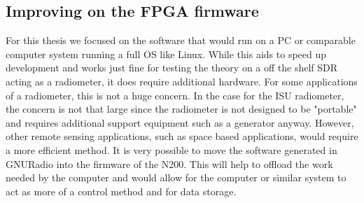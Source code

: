 

\subsection{Improving on the FPGA firmware}

For this thesis we focused on the software that would run on a PC or comparable computer system running a full OS like Linux.  While this aids to speed up development and works just fine for testing the theory on a off the shelf SDR acting as a radiometer, it does require additional hardware.  For some applications of a radiometer, this is not a huge concern.  In the case for the ISU radiometer, the concern is not that large since the radiometer is not designed to be "portable" and requires additional support equipment such as a generator anyway.  However, other remote sensing applications, such as space based applications, would require a more efficient method.  It is very possible to move the software generated in GNURadio into the firmware of the N200.  This will help to offload the work needed by the computer and would allow for the computer or similar system to act as more of a control method and for data storage.  

